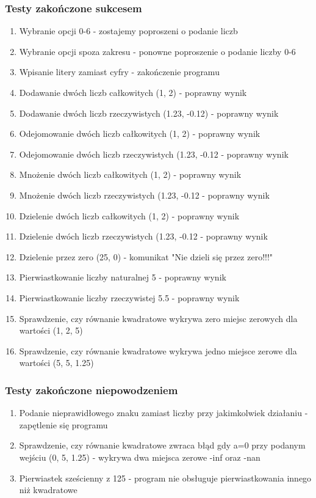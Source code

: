 \documentclass{article}
\begin{document}
\subsubsection{Testy zakończone sukcesem}
\begin{enumerate}
\item Wybranie opcji 0-6 - zostajemy poproszeni o podanie liczb
\item Wybranie opcji spoza zakresu - ponowne poproszenie o podanie liczby 0-6
\item Wpisanie litery zamiast cyfry - zakończenie programu
\item Dodawanie dwóch liczb całkowitych (1, 2) - poprawny wynik
\item Dodawanie dwóch liczb rzeczywistych (1.23, -0.12) - poprawny wynik
\item Odejomowanie dwóch liczb całkowitych (1, 2) - poprawny wynik
\item Odejomowanie dwóch liczb rzeczywistych (1.23, -0.12 - poprawny wynik
\item Mnożenie dwóch liczb całkowitych (1, 2) - poprawny wynik
\item Mnożenie dwóch liczb rzeczywistych (1.23, -0.12 - poprawny wynik
\item Dzielenie dwóch liczb całkowitych (1, 2) - poprawny wynik
\item Dzielenie dwóch liczb rzeczywistych (1.23, -0.12 - poprawny wynik
\item Dzielenie przez zero (25, 0) - komunikat "Nie dzieli się przez zero!!!"
\item Pierwiastkowanie liczby naturalnej 5 - poprawny wynik
\item Pierwiastkowanie liczby rzeczywistej 5.5 - poprawny wynik
\item Sprawdzenie, czy równanie kwadratowe wykrywa zero miejsc zerowych dla wartości (1, 2, 5)
\item Sprawdzenie, czy równanie kwadratowe wykrywa jedno miejsce zerowe dla wartości (5, 5, 1.25)
\end{enumerate}
\subsubsection{Testy zakończone niepowodzeniem}
\begin{enumerate}

\item Podanie nieprawidłowego znaku  zamiast liczby przy jakimkolwiek działaniu - zapętlenie się programu
\item Sprawdzenie, czy równanie kwadratowe zwraca błąd gdy a=0 przy podanym wejściu (0, 5, 1.25) - wykrywa dwa miejsca zerowe -inf oraz -nan  
\item Pierwiastek sześcienny z 125 - program nie obsługuje pierwiastkowania innego niż kwadratowe


\end{enumerate}
\end{document}

